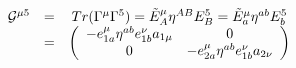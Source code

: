 \begin{equation}
\begin{array}{ccc}
{\cal G}^{\mu 5} & = &  Tr ( \Gamma^\mu \Gamma^5 ) ={\tilde
E}^\mu_A \eta^{AB} E^5_B = {\tilde E}^\mu_a \eta^{ab} E^5_b\\
& = & \left(\begin{array}{cc}
 - e^\mu_{1a} \eta^{ab} e^\nu_{1b} a_{1\mu}  & 0 \\
  0 & - e^\mu_{2a} \eta^{ab} e^\nu_{1b} a_{2\nu}
\end{array}
\right)
\end{array}
\end{equation}

